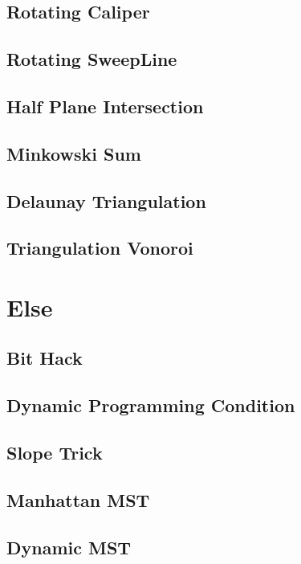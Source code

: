 \subsection{Rotating Caliper}

\subsection{Rotating SweepLine}

\subsection{Half Plane Intersection}

\subsection{Minkowski Sum}

\subsection{Delaunay Triangulation}

\subsection{Triangulation Vonoroi}


\section{Else}
\subsection{Bit Hack}

\subsection{Dynamic Programming Condition}

\subsection{Slope Trick}

\subsection{Manhattan MST}

\subsection{Dynamic MST}

